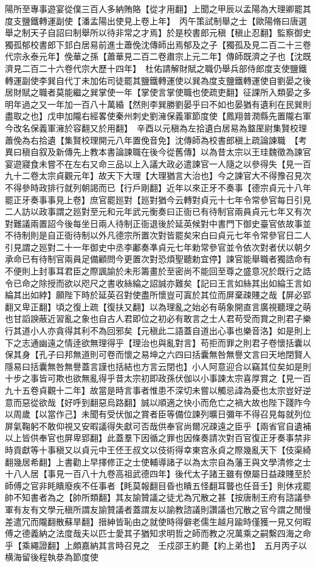 陽所至專事遊宴從僕三百人多納賄賂【從才用翻】上聞之甲辰以孟陽為大理卿罷其度支鹽鐵轉運副使【潘孟陽出使見上卷上年】　丙午策試制舉之士【歐陽脩曰唐選舉之制天子自詔曰制舉所以待非常之才焉】於是校書郎元稹【稹止忍翻】監察御史獨孤郁校書郎下邽白居易前進士蕭俛沈傳師出焉郁及之子【獨孤及見二百二十三卷代宗永泰元年】俛華之孫【蕭華見二百二卷肅宗上元二年】傳師既濟之子也【沈既濟見二百二十六卷代宗大歷十四年】　杜佑請解財賦之職仍舉兵部侍郎度支使鹽鐵轉運副使李巽自代丁未加佑司徒罷其鹽鐵轉運使以巽為度支鹽鐵轉運使自劉晏之後居財賦之職者莫能繼之巽掌使一年【掌使言掌使職也使疏吏翻】征課所入類晏之多明年過之又一年加一百八十萬緍【然則李巽勝劉晏乎曰不如也晏猶有遺利在民巽則盡取之也】戊申加隴右經畧使秦州刺史劉澭保義軍節度使【鳳翔普潤縣先置隴右軍今改名保義軍澭於容翻又於用翻】　辛酉以元稹為左拾遺白居易為盩厔尉集賢校理蕭俛為右拾遺【集賢校理開元八年置俛音免】沈傳師為校書郎稹上疏論諫職　【考異曰稹自叙及新傳先上教本書論諫職在後今從舊傳】以為昔太宗以王珪魏徵為諫官宴遊寢食未嘗不在左右又命三品以上入議大政必遣諫官一人隨之以參得失【見一百九十二卷太宗貞觀元年】故天下大理【大理猶言大治也】今之諫官大不得豫召見次不得參時政排行就列朝謁而已【行戶剛翻】近年以來正牙不奏事【德宗貞元十八年罷正牙奏事事見上卷】庶官罷廵對【廵對猶今云轉對貞元十七年令常參官每日引見二人訪以政事謂之廵對至元和元年武元衡奏曰正衙已有待制官兩員貞元七年又有次對難議兩置詔今後每坐日兩人待制正衙退後於延英候對中書門下御史臺官依故事並不待制則是自正衙待制以外凡德宗所置次對皆罷矣宋白曰貞元七年令常參官日二人引見謂之廵對二十一年御史中丞李鄘奏凖貞元七年勅常參官並令依次對者伏以朝夕承命已有待制官兩員足備顧問今更置次對恐煩聖聽勅宜停】諫官能舉職者獨誥命有不便則上封事耳君臣之際諷諭於未形籌畫於至密尚不能回至尊之盛意况於既行之誥令已命之除授而欲以咫尺之書收絲綸之詔誠亦難矣【記曰王言如絲其出如綸王言如綸其出如綍】願陛下時於延英召對使盡所懷豈可寘於其位而屏棄疎賤之哉【屏必郢翻又卑正翻】頃之復上疏【復扶又翻】以為理亂之始必有萌象開直言廣視聽理之萌也甘謟諛蔽近習亂之象也自古人君即位之初必有敢言之士人君苟受而賞之則君子樂行其道小人亦貪得其利不為回邪矣【元稹此二語蓋自道出心事也樂音洛】如是則上下之志通幽遠之情逹欲無理得乎【理治也與亂對言】苟拒而罪之則君子卷懷括囊以保其身【孔子曰邦無道則可卷而懷之易坤之六四曰括囊無咎無譽文言曰天地閉賢人隱易曰括囊無咎無譽蓋言謹也括結也方言云閉也】小人阿意迎合以竊其位矣如是則十步之事皆可欺也欲無亂得乎昔太宗初即政孫伏伽以小事諫太宗喜厚賞之【見一百九十五卷貞觀十二年】故當是時言事者惟患不深切未嘗以觸忌諱為憂也太宗豈好逆意而惡從欲哉【好呼到翻惡烏路翻】誠以順適之快小而危亡之禍大故也陛下踐阼今以周歲【以當作己】未聞有受伏伽之賞者臣等備位諫列曠日彌年不得召見每就列位屏氣鞠躬不敢仰視又安暇議得失獻可否哉供奉官尚爾况疎遠之臣乎【兩省官自遺補以上皆供奉官也屏卑郢翻】此蓋羣下因循之罪也因條奏請次對百官復正牙奏事禁非時貢獻等十事稹又以貞元中王伾王叔文以伎術得幸東宫永貞之際幾亂天下【伎渠綺翻幾居希翻】上書勸上早擇修正之士使輔導諸子以為太宗自為藩王與文學清修之士十八人居【事見一百八十九卷高祖武德四年】後代太子諸王雖有僚屬日益疎賤至於師傅之官非眊瞶廢疾不任事者【眊莫報翻目昏也瞶五怪翻耳聾也任音壬】則休戎罷帥不知書者為之【帥所類翻】其友諭贊議之徒尤為冗散之甚【按唐制王府有諮議參軍有友有文學元稹所謂友諭贊議者蓋謂友以諭教諮議則讚議也冗散之官今謂之閒慢差遣冗而隴翻散蘇旱翻】搢紳皆恥由之就使時得僻老儒生越月踰時僅獲一見又何暇傅之德義納之法度哉夫以匹士愛其子猶知求明哲之師而教之况萬乘之嗣繫四海之命乎【乘繩證翻】上頗嘉納其言時召見之　壬戍邵王約薨【約上弟也】　五月丙子以横海留後程執㳟為節度使　